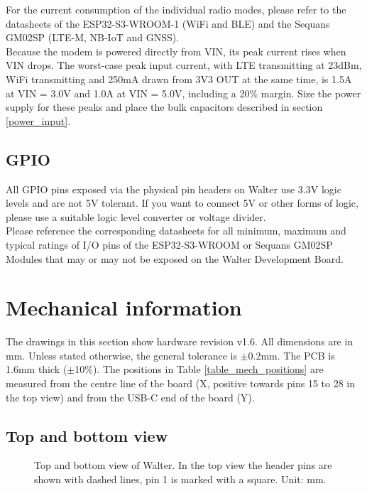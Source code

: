 \documentclass[11pt]{article}
\begin{document}
For the current consumption of the individual radio modes, please refer to the datasheets of the ESP32-S3-WROOM-1 (WiFi and BLE) and the Sequans GM02SP (LTE-M, NB-IoT and GNSS).\\

Because the modem is powered directly from VIN, its peak current rises when VIN drops. The worst-case peak input current, with LTE transmitting at 23dBm, WiFi transmitting and 250mA drawn from 3V3 OUT at the same time, is 1.5A at VIN = 3.0V and 1.0A at VIN = 5.0V, including a 20\% margin. Size the power supply for these peaks and place the bulk capacitors described in section \ref{power_input}.

\subsection{GPIO} \label{gpio}
All GPIO pins exposed via the physical pin headers on Walter use 3.3V logic levels and are not 5V tolerant. If you want to connect 5V or other forms of logic, please use a suitable logic level converter or voltage divider.\\

Please reference the corresponding datasheets for all minimum, maximum and typical ratings of I/O pins of the ESP32-S3-WROOM or Sequans GM02SP Modules that may or may not be exposed on the Walter Development Board.

\newpage
\section{Mechanical information} \label{mechanical}
The drawings in this section show hardware revision v1.6. All dimensions are in mm. Unless stated otherwise, the general tolerance is $\pm$0.2mm. The PCB is 1.6mm thick ($\pm$10\%). The positions in Table \ref{table_mech_positions} are measured from the centre line of the board (X, positive towards pins 15 to 28 in the top view) and from the USB-C end of the board (Y).

\subsection{Top and bottom view} \label{mech_views}
\begin{figure}[H]
    \centering
    
    \caption{Top and bottom view of Walter. In the top view the header pins are shown with dashed lines, pin 1 is marked with a square. Unit: mm.}
    \label{fig:mechanical_views}
\end{figure}
\end{document}
